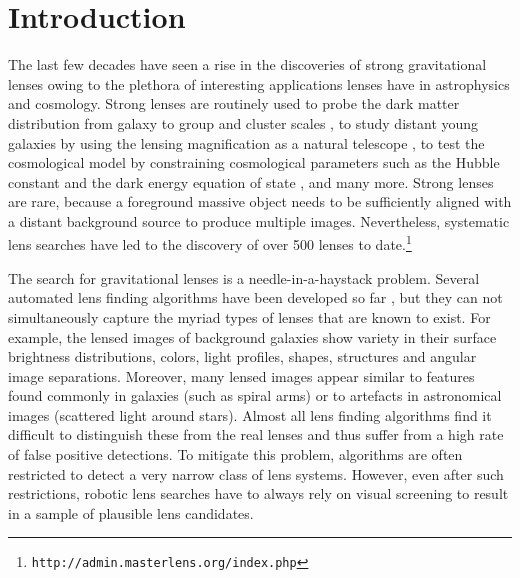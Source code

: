 \documentclass[useAMS,usenatbib,a4paper]{mn2e}
\begin{document}
\section{Introduction}
\label{sec:intro}

The last few decades have seen a rise in the discoveries of strong
gravitational lenses owing to the plethora of interesting applications
lenses have in astrophysics and cosmology. Strong lenses are routinely
used to probe the dark matter distribution from galaxy
\citep[e.g.][]{Koopmans2006,Barnabe2009,Leier2011,Sonnenfeld2015} to group and
cluster scales
\citep[e.g.][]{Limousin2008,Zitrin2011,Oguri2012,More2012,Newman2013}, to
study distant young galaxies by using the lensing magnification as a
natural telescope \citep[e.g.][]{Zitrin2009,Zheng2012,Whitaker2014}, to
test the cosmological model by constraining cosmological parameters such
as the Hubble constant and the dark energy equation of state
\citep[e.g.][]{Suyu2010,Collett2012,Collett2014,Sereno2014}, and many more. Strong
lenses are rare, because a foreground massive object needs to be
sufficiently aligned with a distant background source to produce
multiple images. Nevertheless, systematic lens searches have led to the
discovery of over 500 lenses to
date.\footnote{\texttt{http://admin.masterlens.org/index.php}}

The search for gravitational lenses is a needle-in-a-haystack problem.
Several automated lens finding algorithms have
been developed so far
\citep[e.g.][]{Lenzen2004,Alard2006,Seidel2007,More2012,Brault2014,Gavazzi2014},
but they can not
simultaneously capture the myriad types of lenses that are known to
exist. For example, the lensed images of background galaxies show
variety in their surface brightness distributions, colors, light
profiles, shapes, structures and angular image separations.  Moreover,
many lensed images appear similar to features found commonly in galaxies
(such as spiral arms) or to artefacts in astronomical images (scattered
light around stars).  Almost all lens finding algorithms find it
difficult to distinguish these from the real lenses and thus suffer
from a high rate of false positive detections.  To mitigate this problem,
algorithms are often restricted to detect a very narrow class of lens
systems. However, even after such restrictions, robotic lens searches
have to always rely on visual screening to result in a sample of plausible
lens candidates.
\end{document}
